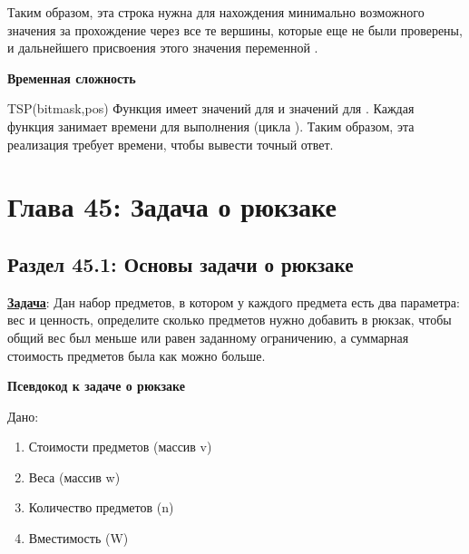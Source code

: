 \vspace{\baselineskip}
Таким образом, эта строка нужна для нахождения минимально возможного значения за прохождение через все те вершины, которые еще не были проверены, и дальнейшего присвоения этого значения переменной .

\vspace{\baselineskip}
\textbf{Временная сложность}

\vspace{\baselineskip} TSP(bitmask,pos)
Функция  имеет  значений для  и  значений для . Каждая функция занимает  времени для выполнения (цикла ). Таким образом, эта реализация требует  времени, чтобы вывести точный ответ.

\chapter*{Глава 45: Задача о рюкзаке}

\vspace{\baselineskip}
\section*{Раздел 45.1: Основы задачи о рюкзаке}

\vspace{\baselineskip}
\href{https://vk.cc/atR60o}{\textbf{\underline{Задача}}}: Дан набор предметов, в котором у каждого предмета есть два параметра: вес и ценность, определите сколько предметов нужно добавить в рюкзак, чтобы общий вес был меньше или равен заданному ограничению, а суммарная стоимость предметов была как можно больше.

\vspace{\baselineskip}
\textbf{Псевдокод к задаче о рюкзаке}

\vspace{\baselineskip}
Дано:

\vspace{\baselineskip}
\begin{enumerate}
    \item Стоимости предметов (массив v)
    \item Веса (массив w)
    \item Количество предметов (n)
    \item Вместимость (W)
\end{enumerate}

